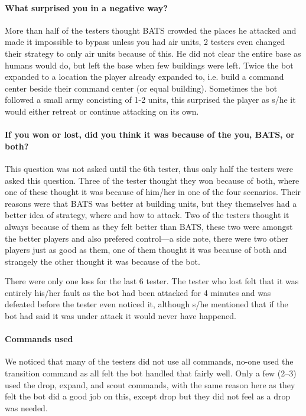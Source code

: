 \paragraph{What surprised you in a negative way?}
More than half of the testers thought BATS crowded the places he attacked and made it impossible to bypass unless you had air units, 2 testers even changed their strategy to only air units because of this. He did not clear the entire base as humans would do, but left the base when few buildings were left. Twice the bot expanded to a location the player already expanded to, i.e. build a command center beside their command center (or equal building). Sometimes the bot followed a small army concisting of 1-2 units, this surprised the player as s/he it would either retreat or continue attacking on its own.

\paragraph{If you won or lost, did you think it was because of the you, BATS, or both?}
This question was not asked until the 6th tester, thus only half the testers were asked this question. Three of the tester thought they won because of both, where one of these thought it was because of him/her in one of the four scenarios. Their reasons were that BATS was better at building units, but they themselves had a better idea of strategy, where and how to attack. Two of the testers thought it always because of them as they felt better than BATS, these two were amongst the better players and also prefered control—a side note, there were two other players just as good as them, one of them thought it was because of both and strangely the other thought it was because of the bot.

There were only one loss for the last 6 tester. The tester who lost felt that it was entirely his/her fault as the bot had been attacked for 4 minutes and was defeated before the tester even noticed it, although s/he mentioned that if the bot had said it was under attack it would never have happened.

\paragraph{Commands used}
We noticed that many of the testers did not use all commands, no-one used the transition command as all felt the bot handled that fairly well. Only a few (2–3) used the drop, expand, and scout commands, with the same reason here as they felt the bot did a good job on this, except drop but they did not feel as a drop was needed.

